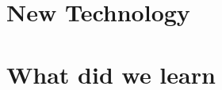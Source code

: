 \documentclass[10pt,draftclsnofoot,onecolumn]{IEEEtran}
\begin{document}
\newpage
\section{New Technology} %

\newpage
\section{What did we learn} %
\end{document}
